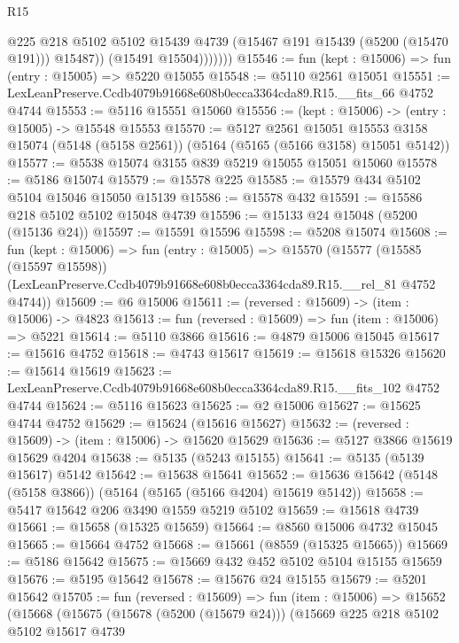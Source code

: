 \begin{lexlean}{R15}
\begin{coremodule}
{{{{{{{{{{{                    @225
                    @218
                    @5102
                    @5102
                    @15439
                    @4739
                    (@15467 @191 @15439 (@5200 (@15470 @191)))
                    @15487))
                (@15491 @15504)))))))
@15546 := fun (kept : @15006) => fun (entry : @15005) => @5220 @15055
@15548 := @5110 @2561 @15051
@15551 := LexLeanPreserve.Ccdb4079b91668e608b0ecca3364cda89.R15.__fits_66 @4752 @4744
@15553 := @5116 @15551 @15060
@15556 := (kept : @15006) -> (entry : @15005) -> @15548 @15553
@15570 := @5127
    @2561
    @15051
    @15553
    @3158
    @15074
    (@5148 (@5158 @2561))
    (@5164 (@5165 (@5166 @3158) @15051 @5142))
@15577 := @5538 @15074 @3155 @839 @5219 @15055 @15051 @15060
@15578 := @5186 @15074
@15579 := @15578 @225
@15585 := @15579 @434 @5102 @5104 @15046 @15050 @15139
@15586 := @15578 @432
@15591 := @15586 @218 @5102 @5102 @15048 @4739
@15596 := @15133 @24 @15048 (@5200 (@15136 @24))
@15597 := @15591 @15596
@15598 := @5208 @15074
@15608 := fun (kept : @15006) =>
  fun (entry : @15005) =>
  @15570
    (@15577
      (@15585 (@15597 @15598))
      (LexLeanPreserve.Ccdb4079b91668e608b0ecca3364cda89.R15.__rel_81 @4752 @4744))
@15609 := @6 @15006
@15611 := (reversed : @15609) -> (item : @15006) -> @4823
@15613 := fun (reversed : @15609) => fun (item : @15006) => @5221
@15614 := @5110 @3866
@15616 := @4879 @15006 @15045
@15617 := @15616 @4752
@15618 := @4743 @15617
@15619 := @15618 @15326
@15620 := @15614 @15619
@15623 := LexLeanPreserve.Ccdb4079b91668e608b0ecca3364cda89.R15.__fits_102 @4752 @4744
@15624 := @5116 @15623
@15625 := @2 @15006
@15627 := @15625 @4744 @4752
@15629 := @15624 (@15616 @15627)
@15632 := (reversed : @15609) -> (item : @15006) -> @15620 @15629
@15636 := @5127 @3866 @15619 @15629 @4204
@15638 := @5135 (@5243 @15155)
@15641 := @5135 (@5139 @15617) @5142
@15642 := @15638 @15641
@15652 := @15636 @15642 (@5148 (@5158 @3866)) (@5164 (@5165 (@5166 @4204) @15619 @5142))
@15658 := @5417 @15642 @206 @3490 @1559 @5219 @5102
@15659 := @15618 @4739
@15661 := @15658 (@15325 @15659)
@15664 := @8560 @15006 @4732 @15045
@15665 := @15664 @4752
@15668 := @15661 (@8559 (@15325 @15665))
@15669 := @5186 @15642
@15675 := @15669 @432 @452 @5102 @5104 @15155 @15659
@15676 := @5195 @15642
@15678 := @15676 @24 @15155
@15679 := @5201 @15642
@15705 := fun (reversed : @15609) =>
  fun (item : @15006) =>
  @15652
    (@15668
      (@15675
        (@15678 (@5200 (@15679 @24)))
        (@15669
          @225
          @218
          @5102
          @5102
          @15617
          @4739
}}}}}}}}}}}
\end{coremodule}
\end{lexlean}
